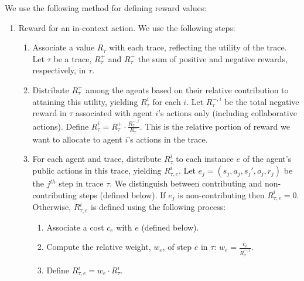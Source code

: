 \documentclass[runningheads]{llncs}
\begin{document}
We use the following method for defining reward values: 
\begin{enumerate}
    \item Reward for an in-context action. We use the following steps:
    \begin{enumerate}
        \item Associate a value $R_\tau$ with each trace, reflecting the utility of the trace. Let $\tau$ be a trace, $R^+_{\tau}$ and $R^-_{\tau}$ the sum of positive and negative rewards, respectively, in $\tau$.
        
        \item Distribute $R^+_\tau$ among the agents based on their relative contribution to attaining this utility, yielding $R^i_\tau$ for each $i$. Let $R^{-,i}_{\tau}$ be the total negative reward in $\tau$ associated with agent $i$'s actions only (including collaborative actions). Define $R_\tau^i = R^+_\tau \cdot \frac{R^{-,i}_\tau}{R^-_\tau}.$ This is the relative portion of reward we want to allocate to agent $i$'s actions in the trace.
        
        \item For each agent and trace, distribute $R^i_\tau$ to each instance $e$ of the agent's public actions in this trace, yielding $R^i_{\tau,e}$. Let $e_j=(s_j,a_j,s_j',o_j,r_j)$ be the $j^{th}$ step in trace $\tau$. We distinguish between {contributing} and {non-contributing} steps (defined below). If $e_j$ is non-contributing then $R^i_{\tau,e}=0$. Otherwise, $R^i_{\tau,e}$ is defined using the following process: 
        \begin{enumerate}
            \item Associate a cost  $c_e$ with $e$ (defined below).
            \item Compute the relative weight, $w_e$, of step $e$ in $\tau$: $w_e=\frac{c_e}{R^{-,i}_\tau}$. 
            \item Define $R^i_{\tau,e} = w_e \cdot R_\tau^i$. %
        \end{enumerate}
        

\end{enumerate}
\end{enumerate}
\end{document}
